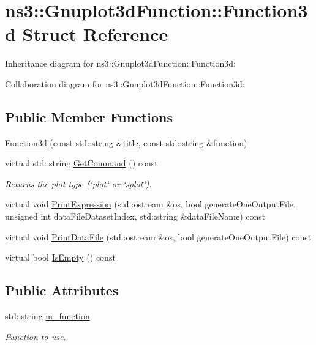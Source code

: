 \hypertarget{structns3_1_1Gnuplot3dFunction_1_1Function3d}{}\section{ns3\+:\+:Gnuplot3d\+Function\+:\+:Function3d Struct Reference}
\label{structns3_1_1Gnuplot3dFunction_1_1Function3d}


Inheritance diagram for ns3\+:\+:Gnuplot3d\+Function\+:\+:Function3d\+:


Collaboration diagram for ns3\+:\+:Gnuplot3d\+Function\+:\+:Function3d\+:
\subsection*{Public Member Functions}
\begin{DoxyCompactItemize}
\item 
\hyperlink{structns3_1_1Gnuplot3dFunction_1_1Function3d_aa63e8a40a2b2fa197512e916490d2c98}{Function3d} (const std\+::string \&\hyperlink{lte__link__budget__x2__handover__measures_8m_a3f4b991df405379f6917e1683ed5a8c8}{title}, const std\+::string \&function)
\item 
virtual std\+::string \hyperlink{structns3_1_1Gnuplot3dFunction_1_1Function3d_a46f3a40ebb95fb7fd076510e58dd8ab3}{Get\+Command} () const 
\begin{DoxyCompactList}\small\item\em Returns the plot type (\char`\"{}plot\char`\"{} or \char`\"{}splot\char`\"{}). \end{DoxyCompactList}\item 
virtual void \hyperlink{structns3_1_1Gnuplot3dFunction_1_1Function3d_a3185c2137bc17360221287de61a286b2}{Print\+Expression} (std\+::ostream \&os, bool generate\+One\+Output\+File, unsigned int data\+File\+Dataset\+Index, std\+::string \&data\+File\+Name) const 
\item 
virtual void \hyperlink{structns3_1_1Gnuplot3dFunction_1_1Function3d_a42172f15115418cd7c975a67976ee40b}{Print\+Data\+File} (std\+::ostream \&os, bool generate\+One\+Output\+File) const 
\item 
virtual bool \hyperlink{structns3_1_1Gnuplot3dFunction_1_1Function3d_a9aaa547b9447e8cfb51a6381058f5ae9}{Is\+Empty} () const 
\end{DoxyCompactItemize}
\subsection*{Public Attributes}
\begin{DoxyCompactItemize}
\item 
std\+::string \hyperlink{structns3_1_1Gnuplot3dFunction_1_1Function3d_a27c677166847f2c04a99a9c280ecdd22}{m\+\_\+function}
\begin{DoxyCompactList}\small\item\em Function to use. \end{DoxyCompactList}\end{DoxyCompactItemize}


